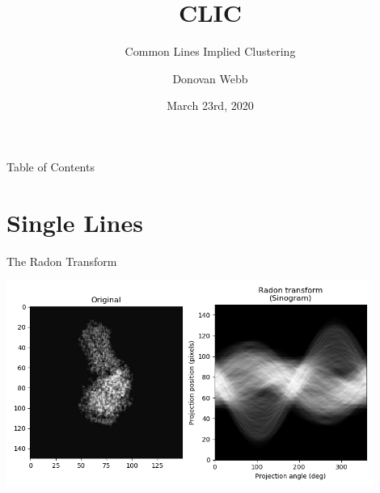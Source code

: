\documentclass[t, 11pt, xcolor=dvipsnames]{beamer}
\date{March 23rd, 2020}
\author{Donovan Webb}
\institute{eBIC/University of Bath}
\title{CLIC}
\subtitle{Common Lines Implied Clustering}
\begin{document}
\begin{frame}[plain]
  \maketitle
\end{frame}
\addtocounter{framenumber}{-1} %

\begin{frame}{Table of Contents}
  \tableofcontents[sectionstyle=show/show, hideallsubsections]
\end{frame}


\section{Single Lines}

\begin{frame}[fragile]{The Radon Transform}
 \begin{center}\includegraphics[width=0.9\textwidth]{images/Sinogram_Proj1.png}
    \end{center}
\vspace{-1em}
\end{frame}
\end{document}

